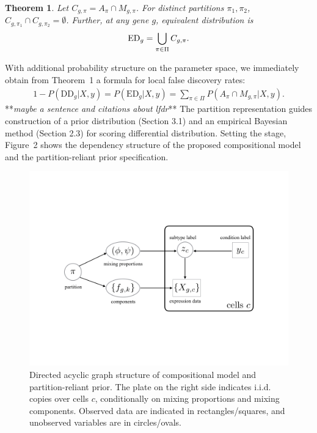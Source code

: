 \documentclass[11pt]{amsart}
\newtheorem{theorem}{Theorem}
\begin{document}
\begin{theorem}  Let $C_{g,\pi} = A_\pi\cap M_{g, \pi}$.  For distinct 
partitions $\pi_1,\pi_2$, $C_{g,\pi_1} \cap C_{g,\pi_2} = \emptyset$. Further,
 at any gene $g$, equivalent distribution is
\begin{eqnarray*}
{\rm{ED}}_g = \bigcup_{\pi \in \Pi} C_{g,\pi}.
\end{eqnarray*}
\end{theorem}
With additional 
probability structure on the parameter space,  we immediately obtain from Theorem~1 
a formula for local false discovery rates:
\begin{align}
\label{eq:lfdr}
1-P(\text{DD}_g|X,y) = 
 P(\text{ED}_g|X,y) = \sum_{\pi \in \Pi} P\left(A_\pi \cap M_{g,\pi} |X,y \right).
\end{align}
**{\em maybe a sentence and citations about lfdr}**
The partition representation guides construction of a prior distribution (Section 3.1) and an empirical Bayesian 
method (Section 2.3) for scoring  differential distribution.   Setting the stage, 
Figure~2 shows the dependency structure of 
the proposed compositional model and the partition-reliant prior specification.

\begin{figure}[h!]
\includegraphics[trim={4cm 6cm 4cm 6cm}, clip, width=5in]{Figs/dag.png}
  \caption{Directed acyclic graph structure of compositional 
model and partition-reliant prior. The plate on the right side indicates i.i.d.
copies over cells $c$, conditionally on mixing proportions and mixing components.
 Observed data are indicated in rectangles/squares, and unobserved variables
are in circles/ovals. }
  \label{fig:2}
\end{figure}
\end{document}

